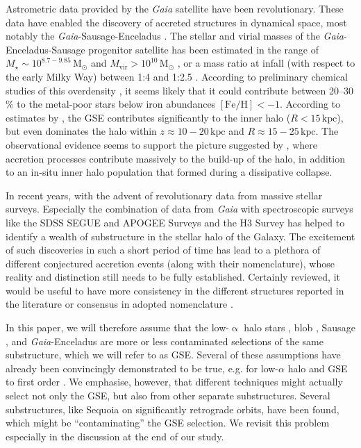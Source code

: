 \documentclass[fleqn,usenatbib]{mnras}
\newcommand{\Msol}{\,\mathrm{M_\odot}} %
\newcommand{\kpc}{\,\mathrm{kpc}}	%
\newcommand{\Gaia}{\textit{Gaia}\xspace} %
\begin{document}
Astrometric data provided by the \Gaia satellite \citep{Brown2016} have been revolutionary. These data have enabled the discovery of accreted structures in dynamical space, most notably the \Gaia-Sausage-Enceladus \citep[GSE, see e.g.][]{Belokurov2018, Helmi2018, Helmi2020}. The stellar and virial masses of the \Gaia-Enceladus-Sausage progenitor satellite has been estimated in the range of $M_\star \sim 10^{8.7-9.85}\Msol$ \citep{Feuillet2020,Naidu2021} and $M_\text{vir} > 10^{10}\Msol$ \citep{Belokurov2018}, or a mass ratio at infall (with respect to the early Milky Way) between 1:4 and 1:2.5 \citep{Helmi2018,Naidu2021}. According to preliminary chemical studies of this overdensity \citep{Das2020}, it seems likely that it could contribute between 20--30\,\% to the metal-poor stars below iron abundances $\mathrm{[Fe/H]} < -1$. According to estimates by \citet{Naidu2020}, the GSE contributes significantly to the inner halo ($R < 15\kpc$), but even dominates the halo within $z \approx 10-20 \kpc$ and $R \approx 15-25 \kpc$. The observational evidence \citep[for reviews see][]{Nissen2018, Helmi2020} seems to support the picture suggested by \citet{Searle1978}, where accretion processes contribute massively to the build-up of the halo, in addition to an in-situ inner halo population that formed during a dissipative collapse. 

In recent years, with the advent of revolutionary data from massive stellar surveys. Especially the combination of data from \Gaia with spectroscopic surveys like the SDSS SEGUE and APOGEE Surveys \citep[e.g.][]{Belokurov2018, Helmi2018, Mackereth2018, Hayes2018, Myeong2018a, Das2020} and the H3 Survey \citep{Conroy2019, Naidu2020, Bonaca2020} has helped to identify a wealth of substructure in the stellar halo of the Galaxy. The excitement of such discoveries in such a short period of time has lead to a plethora of different conjectured accretion events (along with their nomenclature), whose reality and distinction still needs to be fully established. Certainly reviewed, it would be useful to have more consistency in the different structures reported in the literature \citep{Helmi2020} or consensus in adopted nomenclature \citep[see e.g][]{Naidu2020}. 

In this paper, we will therefore assume that the low-$\upalpha$ halo stars \citep{Nissen2010, Hayes2018}, blob \citep{Koppelman2018, Das2020}, Sausage \citep{Belokurov2018}, and \Gaia-Enceladus \citep{Helmi2018} are more or less contaminated selections of the same substructure, which we will refer to as GSE. Several of these assumptions have already been convincingly demonstrated to be true, e.g. for low-$\alpha$ halo and GSE to first order \citep{Haywood2018, Mackereth2019}. We emphasise, however, that different techniques might actually select not only the GSE, but also from other separate substructures. Several substructures, like Sequoia \citep{Barba2019, Myeong2019, Monty2020} on significantly retrograde orbits, have been found, which might be ``contaminating'' the GSE selection. We revisit this problem especially in the discussion at the end of our study.
\end{document}
